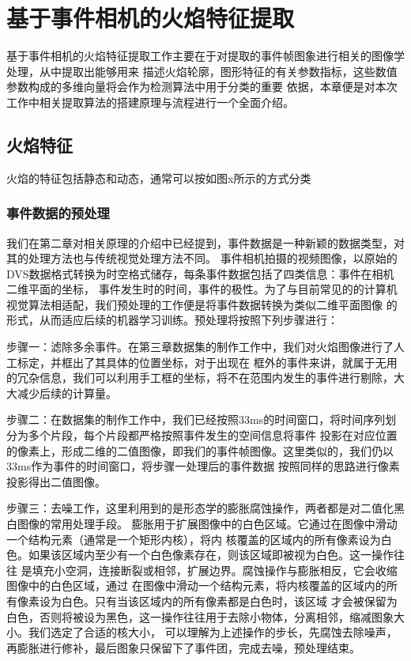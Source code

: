 
\chapter{基于事件相机的火焰特征提取}
基于事件相机的火焰特征提取工作主要在于对提取的事件帧图象进行相关的图像学处理，从中提取出能够用来
描述火焰轮廓，图形特征的有关参数指标，这些数值参数构成的多维向量将会作为检测算法中用于分类的重要
依据，本章便是对本次工作中相关提取算法的搭建原理与流程进行一个全面介绍。

\section{火焰特征}
火焰的特征包括静态和动态，通常可以按如图x所示的方式分类

\subsection{事件数据的预处理}
我们在第二章对相关原理的介绍中已经提到，事件数据是一种新颖的数据类型，对其的处理方法也与传统视觉处理方法不同。
事件相机拍摄的视频图像，以原始的DVS数据格式转换为时空格式储存，每条事件数据包括了四类信息：事件在相机二维平面的坐标，
事件发生时的时间，事件的极性。为了与目前常见的的计算机视觉算法相适配，我们预处理的工作便是将事件数据转换为类似二维平面图像
的形式，从而适应后续的机器学习训练。预处理将按照下列步骤进行：

步骤一：滤除多余事件。在第三章数据集的制作工作中，我们对火焰图像进行了人工标定，并框出了其具体的位置坐标，对于出现在
框外的事件来讲，就属于无用的冗杂信息，我们可以利用手工框的坐标，将不在范围内发生的事件进行剔除，大大减少后续的计算量。

步骤二：在数据集的制作工作中，我们已经按照33ms的时间窗口，将时间序列划分为多个片段，每个片段都严格按照事件发生的空间信息将事件
投影在对应位置的像素上，形成二维的二值图像，即我们的事件帧图像。这里类似的，我们仍以33ms作为事件的时间窗口，将步骤一处理后的事件数据
按照同样的思路进行像素投影得出二值图像。

步骤三：去噪工作，这里利用到的是形态学的膨胀腐蚀操作，两者都是对二值化黑白图像的常用处理手段。
膨胀用于扩展图像中的白色区域。它通过在图像中滑动一个结构元素（通常是一个矩形内核），将内
核覆盖的区域内的所有像素设为白色。如果该区域内至少有一个白色像素存在，则该区域即被视为白色。这一操作往往
是填充小空洞，连接断裂或相邻，扩展边界。腐蚀操作与膨胀相反，它会收缩图像中的白色区域，通过
在图像中滑动一个结构元素，将内核覆盖的区域内的所有像素设为白色。只有当该区域内的所有像素都是白色时，该区域
才会被保留为白色，否则将被设为黑色，这一操作往往用于去除小物体，分离相邻，缩减图象大小。我们选定了合适的核大小，
可以理解为上述操作的步长，先腐蚀去除噪声，再膨胀进行修补，最后图象只保留下了事件团，完成去噪，预处理结束。

